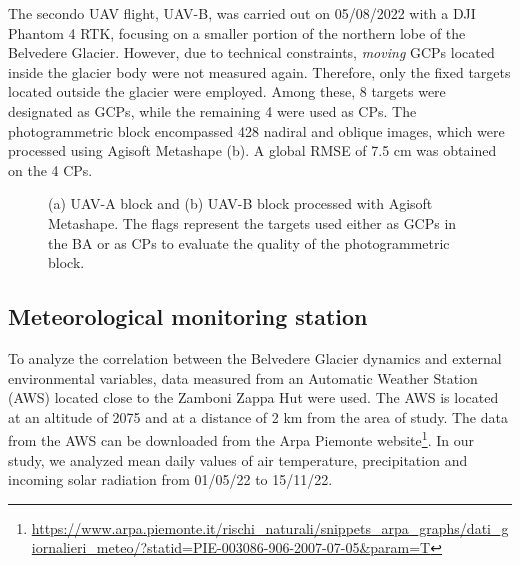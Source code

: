 The secondo UAV flight, UAV-B, was carried out on 05/08/2022 with a DJI Phantom
4 RTK, focusing on a smaller portion of the northern lobe of the Belvedere Glacier.
However, due to technical constraints, \textit{moving} GCPs located inside the
glacier body were not measured again.
Therefore, only the fixed targets located outside the glacier were employed.
Among these, 8 targets were designated as GCPs, while the remaining 4 were used as CPs.
The photogrammetric block encompassed 428 nadiral and oblique images, which
were processed using Agisoft Metashape (b).
A global RMSE of 7.5 cm was obtained on the 4 CPs.

\begin{figure}
  \centering
  \caption{(a) UAV-A block and (b) UAV-B block processed with Agisoft Metashape. The
    flags represent the targets used either as GCPs in the BA or as CPs to evaluate the
    quality of the photogrammetric block.}
  \label{fig:4:uavblocks}
\end{figure}

\subsection{Meteorological monitoring station}\label{sec:4:meteostation}

To analyze the correlation between the Belvedere Glacier dynamics and
external environmental variables, data measured from an Automatic Weather Station (AWS)
located close to the Zamboni Zappa Hut were used.
The AWS is located at an altitude of \SI{2075}{\masl} and at a distance of
2 km from the area of study.
The data from the AWS can be downloaded from the Arpa Piemonte
website\footnote{\url{https://www.arpa.piemonte.it/rischi_naturali/snippets_arpa_graphs/dati_giornalieri_meteo/?statid=PIE-003086-906-2007-07-05&param=T}}.
In our study, we analyzed mean daily values of air temperature, precipitation and
incoming solar radiation from 01/05/22 to 15/11/22.



